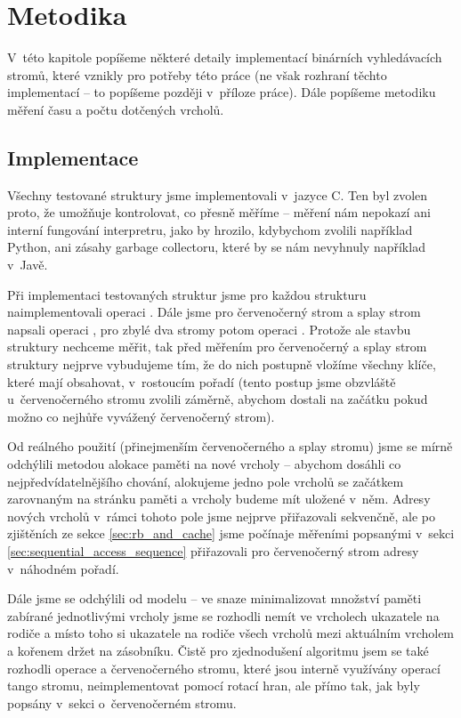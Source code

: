 \chapter{Metodika}

V~této kapitole popíšeme některé detaily implementací binárních vyhledávacích stromů, které vznikly pro potřeby této práce (ne však rozhraní těchto implementací -- to popíšeme později v~příloze práce). Dále popíšeme metodiku měření času a počtu dotčených vrcholů.

\section{Implementace}

Všechny testované struktury jsme implementovali v~jazyce C. Ten byl zvolen
proto, že umožňuje kontrolovat, co přesně měříme -- měření nám nepokazí ani
interní fungování interpretru, jako by hrozilo, kdybychom zvolili například
Python, ani zásahy garbage collectoru, které by se nám nevyhnuly například
v~Javě.

Při implementaci testovaných struktur jsme pro každou strukturu
naimplementovali operaci . Dále jsme pro červenočerný strom a splay
strom napsali operaci , pro zbylé dva stromy potom operaci
. Protože ale stavbu struktury nechceme měřit, tak před měřením pro
červenočerný a splay strom struktury nejprve vybudujeme tím, že do nich
postupně vložíme všechny klíče, které mají obsahovat, v~rostoucím pořadí (tento postup jsme obzvláště u~červenočerného stromu zvolili záměrně, abychom dostali na začátku pokud možno co nejhůře vyvážený červenočerný strom). 

Od reálného použití (přinejmenším červenočerného a splay stromu) jsme se mírně odchýlili metodou alokace paměti na nové vrcholy -- abychom dosáhli co nejpředvídatelnějšího chování, alokujeme jedno pole vrcholů se začátkem zarovnaným na stránku paměti a vrcholy budeme mít uložené v~něm. Adresy nových vrcholů v~rámci tohoto pole jsme nejprve přiřazovali sekvenčně, ale po zjištěních ze sekce \ref{sec:rb_and_cache} jsme počínaje měřeními popsanými v~sekci \ref{sec:sequential_access_sequence} přiřazovali pro červenočerný strom adresy v~náhodném pořadí. 

Dále jsme se odchýlili od modelu -- ve snaze minimalizovat množství paměti
zabírané jednotlivými vrcholy jsme se rozhodli nemít ve vrcholech ukazatele na
rodiče a místo toho si ukazatele na rodiče všech vrcholů mezi aktuálním
vrcholem a kořenem držet na zásobníku. Čistě pro zjednodušení algoritmu jsem se
také rozhodli operace  a  červenočerného stromu, které
jsou interně využívány operací  tango stromu, neimplementovat pomocí
rotací hran, ale přímo tak, jak byly popsány v~sekci o~červenočerném stromu. 

